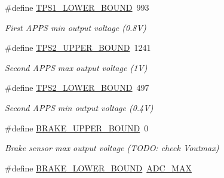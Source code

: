 \begin{DoxyCompactItemize}
\mbox{\label{group___board__model__group_ga9c9aa914f6b372d9ef3f15ce4108da6a}} 
\#define \mbox{\hyperlink{group___board__model__group_ga9c9aa914f6b372d9ef3f15ce4108da6a}{T\+P\+S1\+\_\+\+L\+O\+W\+E\+R\+\_\+\+B\+O\+U\+ND}}~993
\begin{DoxyCompactList}\small\item\em First A\+P\+PS min output voltage (0.\+8V) \end{DoxyCompactList}\item 
\mbox{\label{group___board__model__group_gac8be8d89c699c40b79d04c0fdf6238f4}} 
\#define \mbox{\hyperlink{group___board__model__group_gac8be8d89c699c40b79d04c0fdf6238f4}{T\+P\+S2\+\_\+\+U\+P\+P\+E\+R\+\_\+\+B\+O\+U\+ND}}~1241
\begin{DoxyCompactList}\small\item\em Second A\+P\+PS max output voltage (1V) \end{DoxyCompactList}\item 
\mbox{\label{group___board__model__group_gadfcc723e175ac44e73e38407299ac875}} 
\#define \mbox{\hyperlink{group___board__model__group_gadfcc723e175ac44e73e38407299ac875}{T\+P\+S2\+\_\+\+L\+O\+W\+E\+R\+\_\+\+B\+O\+U\+ND}}~497
\begin{DoxyCompactList}\small\item\em Second A\+P\+PS min output voltage (0.\+4V) \end{DoxyCompactList}\item 
\mbox{\label{group___board__model__group_ga891de03ab9e1bd9a92ffffe69a1b10ca}} 
\#define \mbox{\hyperlink{group___board__model__group_ga891de03ab9e1bd9a92ffffe69a1b10ca}{B\+R\+A\+K\+E\+\_\+\+U\+P\+P\+E\+R\+\_\+\+B\+O\+U\+ND}}~0
\begin{DoxyCompactList}\small\item\em Brake sensor max output voltage (T\+O\+DO\+: check Voutmax) \end{DoxyCompactList}\item 
\mbox{\label{group___board__model__group_ga0aed20cafcc206360abda47b125432c7}} 
\#define \mbox{\hyperlink{group___board__model__group_ga0aed20cafcc206360abda47b125432c7}{B\+R\+A\+K\+E\+\_\+\+L\+O\+W\+E\+R\+\_\+\+B\+O\+U\+ND}}~\mbox{\hyperlink{group___board__model__group_ga555a695bf58df062dc03f0e892d95cd7}{A\+D\+C\+\_\+\+M\+AX}}

\end{DoxyCompactItemize}
